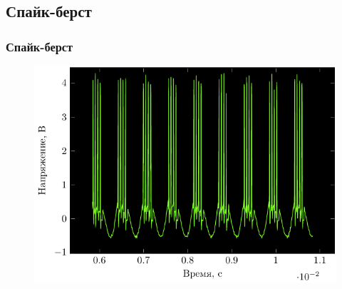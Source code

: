\subsection{Спайк-берст}
\begin{frame}%
	\frametitle{Спайк-берст}
	\begin{figure}[h]
		\hspace{-2em}
		\includegraphics[]{img/berst}
	\end{figure}
\end{frame}
